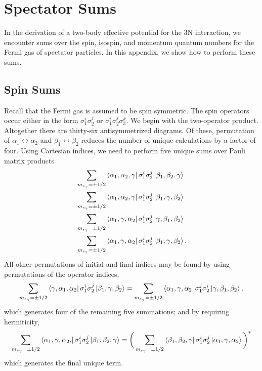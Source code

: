 \chapter{Spectator Sums}

In the derivation of a two-body effective potential for the 3N interaction, we encounter sums over the spin, isospin, and momentum quantum numbers for the Fermi gas of spectator particles. In this appendix, we show how to perform these sums.

\section{Spin Sums}
Recall that the Fermi gas is assumed to be spin symmetric. The spin operators occur either in the form $\sigma_1^i\sigma_2^j$ or $\sigma_1^i\sigma_2^j\sigma_3^k$. We begin with the two-operator product. Altogether there are thirty-six antisymmetrized diagrams. Of these, permutation of $\alpha_1\leftrightarrow \alpha_2$ and $\beta_1\leftrightarrow \beta_2$ reduces the number of unique calculations by a factor of four. Using Cartesian indices, we need to perform five unique sums over Pauli matrix products
\begin{align}
&\sum_{m_{s_\gamma}=\pm1/2} \bra{\alpha_1,\alpha_2, \gamma } \sigma_1^i\sigma_2^j \ket{\beta_1, \beta_2, \gamma} \label{eq:2sigma33}\\
&\sum_{m_{s_\gamma}=\pm1/2} \bra{\alpha_1,\alpha_2, \gamma } \sigma_1^i\sigma_2^j \ket{\beta_1,  \gamma, \beta_2 } \label{eq:2sigma32}\\
 &\sum_{m_{s_\gamma}=\pm1/2} \bra{\alpha_1, \gamma, \alpha_2 } \sigma_1^i\sigma_2^j \ket{\gamma, \beta_1, \beta_2 } \label{eq:2sigma21}\\
 &\sum_{m_{s_\gamma}=\pm1/2} \bra{\alpha_1, \gamma, \alpha_2 } \sigma_1^i\sigma_2^j \ket{\beta_1, \gamma, \beta_2 }. \label{eq:2sigma22}
\end{align}
All other permutations of initial and final indices may be found by using permutations of the operator indices, 
\begin{equation}
\sum_{m_{s_\gamma}=\pm1/2} \bra{ \gamma, \alpha_1, \alpha_2 } \sigma_1^i\sigma_2^j \ket{\beta_1, \gamma, \beta_2 } = \sum_{m_{s_\gamma}=\pm1/2} \bra{\alpha_1, \gamma, \alpha_2 } \sigma_1^j\sigma_2^i \ket{\gamma, \beta_1, \beta_2 },
\end{equation}
which generates four  of the remaining five summations; and by requiring hermiticity,
\begin{equation}
\sum_{m_{s_\gamma}=\pm1/2} \bra{\alpha_1, \gamma,\alpha_2, } \sigma_1^i\sigma_2^j \ket{\beta_1,  \beta_2, \gamma }=
\bigg(\sum_{m_{s_\gamma}=\pm1/2} \bra{\beta_1, \beta_2, \gamma } \sigma_1^i\sigma_2^j \ket{\alpha_1, \gamma, \alpha_2 }\bigg)^*
\end{equation}
which generates the final unique term.


